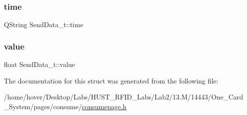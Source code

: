 \subsubsection{\texorpdfstring{time}{time}}
{\footnotesize\ttfamily Q\+String Send\+Data\+\_\+t\+::time}

\mbox{\label{struct_send_data__t_a12f4d4700f5232b86c41e73082ded5ed}} 
\subsubsection{\texorpdfstring{value}{value}}
{\footnotesize\ttfamily float Send\+Data\+\_\+t\+::value}



The documentation for this struct was generated from the following file\+:\begin{DoxyCompactItemize}
\item 
/home/hover/\+Desktop/\+Labs/\+H\+U\+S\+T\+\_\+\+R\+F\+I\+D\+\_\+\+Labs/\+Lab2/13.\+M/14443/\+One\+\_\+\+Card\+\_\+\+System/pages/consume/\mbox{\hyperlink{consumepage_8h}{consumepage.\+h}}\end{DoxyCompactItemize}
